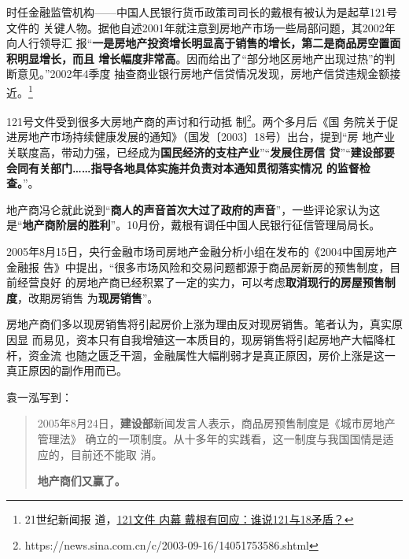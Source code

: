 时任金融监管机构——中国人民银行货币政策司司长的戴根有被认为是起草121号文件的
关键人物。据他自述2001年就注意到房地产市场一些局部问题，其2002年向人行领导汇
报“\textbf{一是房地产投资增长明显高于销售的增长，第二是商品房空置面积明显增长，而且
增长幅度非常高}。因而给出了“部分地区房地产出现过热”的判断意见。”2002年4季度
抽查商业银行房地产信贷情况发现，房地产信贷违规金额接近。\footnote{21世纪新闻报
  道，\href{https://finance.sina.com.cn/x/20031101/1105501003.shtml}{121文件
    内幕 戴根有回应：谁说121与18矛盾？}}

121号文件受到很多大房地产商的声讨和行动抵
制\footnote{https://news.sina.com.cn/c/2003-09-16/14051753586.shtml}。两个多月后《国
务院关于促进房地产市场持续健康发展的通知》（国发〔2003〕18号）出台，提到“房
地产业关联度高，带动力强，已经成为\textbf{国民经济的支柱产业}”“\textbf{发展住房信
  贷}”“\textbf{建设部要会同有关部门……指导各地具体实施并负责对本通知贯彻落实情况
  的监督检查。}”。

地产商冯仑就此说到“\textbf{商人的声音首次大过了政府的声音}”，一些评论家认为这
是“\textbf{地产商阶层的胜利}”。10月份，戴根有调任中国人民银行征信管理局局长。






2005年8月15日，央行金融市场司房地产金融分析小组在发布的《2004中国房地产金融报
告》中提出，“很多市场风险和交易问题都源于商品房新房的预售制度，目前经营良好
的房地产商已经积累了一定的实力，可以考虑\textbf{取消现行的房屋预售制度}，改期房销售
为\textbf{现房销售}”。

房地产商们多以现房销售将引起房价上涨为理由反对现房销售。笔者认为，真实原因显
而易见，资本只有自我增殖这一本质目的，现房销售将引起房地产大幅降杠杆，资金流
也随之匮乏干涸，金融属性大幅削弱才是真正原因，房价上涨是这一真正原因的副作用而已。

袁一泓\cite{2011feiteng}写到：
\begin{quotation}
  2005年8月24日，\textbf{建设部}新闻发言人表示，商品房预售制度是《城市房地产管理法》
  确立的一项制度。从十多年的实践看，这一制度与我国国情是适应的，目前还不能取
  消。

  \textbf{地产商们又赢了。}
\end{quotation}



